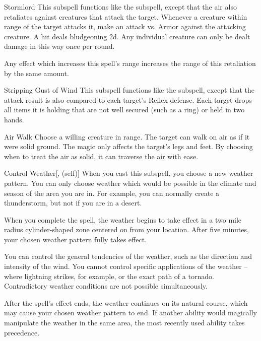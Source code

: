 \begin{ability}[\nth{3}]{Stormlord}
This subspell functions like the  subspell, except that the air also retaliates against creatures that attack the target.
Whenever a creature within \rngclose range of the target attacks it, make an attack vs. Armor against the attacking creature.
A hit deals bludgeoning  \minus2d.
Any individual creature can only be dealt damage in this way once per round.

Any effect which increases this spell's range increases the range of this retaliation by the same amount.
\end{ability}
\vspace{0.25em}


\begin{ability}[\nth{3}]{Stripping Gust of Wind}
This subspell functions like the  subspell, except that the attack result is also compared to each target's Reflex defense.
\hit Each target drops all items it is holding that are not well secured (such as a ring) or held in two hands.
\end{ability}
\vspace{0.25em}


\begin{ability}[\nth{4}]{Air Walk}
Choose a willing creature in \rngclose range.
The target can walk on air as if it were solid ground.
The magic only affects the target's legs and feet.
By choosing when to treat the air as solid, it can traverse the air with ease.
\end{ability}
\vspace{0.25em}


\begin{ability}[\nth{4}]{Control Weather}[,  (self)]
When you cast this subspell, you choose a new weather pattern.
You can only choose weather which would be possible in the climate and season of the area you are in.
For example, you can normally create a thunderstorm, but not if you are in a desert.

When you complete the spell, the weather begins to take effect in a two mile radius cylinder-shaped zone centered on from your location.
After five minutes, your chosen weather pattern fully takes effect.

You can control the general tendencies of the weather, such as the direction and intensity of the wind.
You cannot control specific applications of the weather -- where lightning strikes, for example, or the exact path of a tornado.
Contradictory weather conditions are not possible simultaneously.

After the spell's effect ends, the weather continues on its natural course, which may cause your chosen weather pattern to end.
If another ability would magically manipulate the weather in the same area, the most recently used ability takes precedence.
\end{ability}
\vspace{0.25em}



